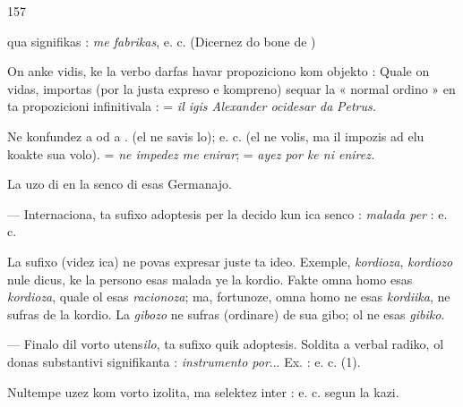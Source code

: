\begin{VUpage}[161]{157}

\VUcontinue
qua signifikas : \textit{me fabrikas}, e. c. (Dicernez do bone \nl
de )

On anke vidis, ke la verbo  darfas havar propoziciono\nl
kom objekto :  Quale on\nl
vidas, importas (por la justa expreso e kompreno) sequar\nl
la « normal ordino » en ta propozicioni infinitivala : \nl
{} = \textit{il igis Alexander ocidesar da}\nl
\textit{Petrus.}

Ne konfundez  a  od a . \cc
{} (el ne savis lo);\nl
{} e. c. (el ne volis, ma il impozis ad\nl
elu koakte sua volo).  = \textit{ne impedez me}\nl
\textit{enirar};  = \textit{ayez por ke ni enirez.}

La uzo di  en la senco di  esas Germanajo.

 --- Internaciona, ta sufixo adoptesis per la decido kun ica senco : \textit{malada per} : \nl
{}\cc
{}\nl
{} e. c.

La sufixo  (videz ica) ne povas expresar juste ta ideo.\nl
Exemple, \textit{kordioza}, \textit{kordiozo} nule dicus, ke la persono esas\nl
malada ye la kordio. Fakte omna homo esas \textit{kordioza}, quale\nl
ol esas \textit{racionoza}; ma, fortunoze, omna homo ne esas \textit{kordiika},\nl
ne sufras de la kordio. La \textit{gibozo} ne sufras (ordinare) de sua\nl
gibo; ol ne esas \textit{gibiko}.

 --- Finalo dil vorto utens\textit{ilo}, ta sufixo quik adoptesis.\nl
Soldita a verbal radiko, ol donas substantivi signifikanta :\nl
\textit{instrumento por}... Ex. : \nl
{} e. c. (1).

Nultempe uzez  kom vorto izolita, ma selektez inter :\nl
{} e. c. segun la kazi.\parplein
\end{VUpage}

